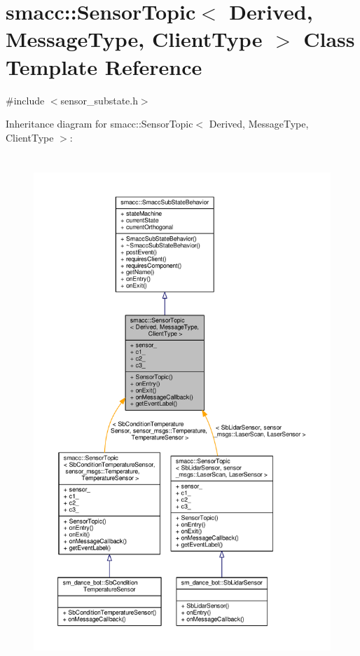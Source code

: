 \hypertarget{classsmacc_1_1SensorTopic}{}\section{smacc\+:\+:Sensor\+Topic$<$ Derived, Message\+Type, Client\+Type $>$ Class Template Reference}
\label{classsmacc_1_1SensorTopic}


{\ttfamily \#include $<$sensor\+\_\+substate.\+h$>$}



Inheritance diagram for smacc\+:\+:Sensor\+Topic$<$ Derived, Message\+Type, Client\+Type $>$\+:
\nopagebreak
\begin{figure}[H]
\begin{center}
\leavevmode
\includegraphics[height=550pt]{classsmacc_1_1SensorTopic__inherit__graph}
\end{center}
\end{figure}


